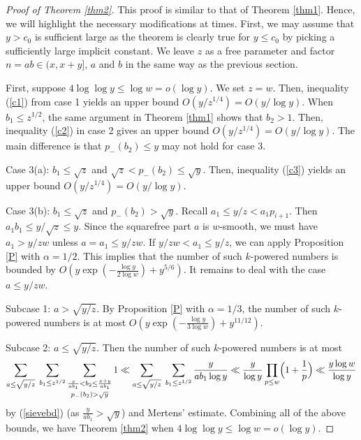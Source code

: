 \documentclass[12pt]{article}
\begin{document}
\begin{proof}[Proof of Theorem \ref{thm2}]

This proof is similar to that of Theorem \ref{thm1}. Hence, we will highlight the necessary modifications at times. First, we may assume that $y > c_0$ is sufficient large as the theorem is clearly true for $y \le c_0$ by picking a sufficiently large implicit constant. We leave $z$ as a free parameter and factor $n = a b \in (x, x +y]$, $a$ and $b$ in the same way as the previous section. 

\bigskip

First, suppose $4 \log \log y \le \log w = o( \log y )$. We set $z = w$. Then, inequality (\ref{c1}) from case 1 yields an upper bound $O(y / z^{1/4}) = O(y / \log y)$. When $b_1 \le z^{1/2}$, the same argument in Theorem \ref{thm1} shows that $b_2 > 1$. Then, inequality (\ref{c2}) in case 2 gives an upper bound $O(y / z^{1/4}) = O(y / \log y)$. The main difference is that $p_{-}(b_2) \le y$ may not hold for case 3. 

\bigskip

Case 3(a): $b_1 \le \sqrt{z}$ and $\sqrt{z} < p_{-}(b_2) \le \sqrt{y}$. Then, inequality (\ref{c3}) yields an upper bound $O(y / z^{1/4}) = O(y / \log y)$.

\bigskip

Case 3(b): $b_1 \le \sqrt{z}$ and $p_{-}(b_2) > \sqrt{y}$. Recall $a_1 \le y / z < a_1 p_{i+1}$. Then $a_1 b_1 \le y / \sqrt{z} \le y$. Since the squarefree part $a$ is $w$-smooth, we must have $a_1 > y / z w$ unless $a = a_1 \le y / z w$. If $y / z w < a_1 \le y / z$, we can apply Proposition \ref{P} with $\alpha = 1/2$. This implies that the number of such $k$-powered numbers is bounded by $O(y \exp(- \frac{\log y}{2 \log w} ) + y^{5/6})$. It remains to deal with the case $a \le y / z w$. 

\bigskip

Subcase 1: $a > \sqrt{y / z}$. By Proposition \ref{P} with $\alpha = 1/3$, the number of such $k$-powered numbers is at most $O(y \exp( - \frac{\log y}{3 \log w}) + y^{11/12})$.

\bigskip

Subcase 2: $a \le \sqrt{y / z}$. Then the number of such $k$-powered numbers is at most
\[
\sum_{a \le \sqrt{y/z}} \; \sum_{b_1 \le z^{1/2}} \mathop{\sum_{\frac{x}{a b_1} < b_2 \le \frac{x + y}{a b_1}}}_{p_{-}(b_2) > \sqrt{y}} 1 \ll \sum_{a \le \sqrt{y/z}} \; \sum_{b_1 \le z^{1/2}} \frac{y}{a b_1 \log y} \ll \frac{y}{\log y} \prod_{p \le w} \Bigl(1 + \frac{1}{p} \Bigr) \ll \frac{y \log w}{\log y}
\]
by (\ref{sievebd}) (as $\frac{y}{a b_1} > \sqrt{y}$) and Mertens' estimate. Combining all of the above bounds, we have Theorem \ref{thm2} when $4 \log \log y \le \log w = o(\log y)$.


\end{proof}
\end{document}
